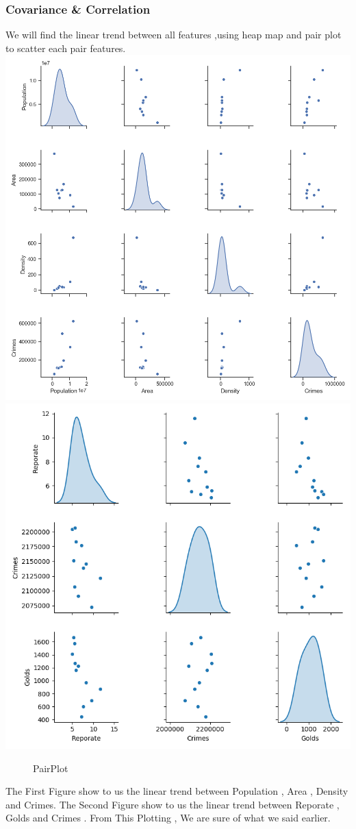 \documentclass[landscape,17pt]{extarticle}
\begin{document}
\subsubsection{Covariance \& Correlation}
We will find the linear trend between all features ,using heap map and pair plot to scatter each pair features.\\
        \includegraphics[width=.5\textwidth,height=.6\textheight]{Images/Figure10.png}
        \includegraphics[width=.5\textwidth,height=.6\textheight]{Images/Figure13.png}
        \label{fig:mina}
\begin{figure}
    \caption{PairPlot}
\end{figure}
The First Figure show to us the linear trend between Population , Area , Density and Crimes. 
The Second Figure show to us the linear trend between Reporate , Golds and Crimes .
From This Plotting , We are sure of what we said earlier.
\newpage
\end{document}
